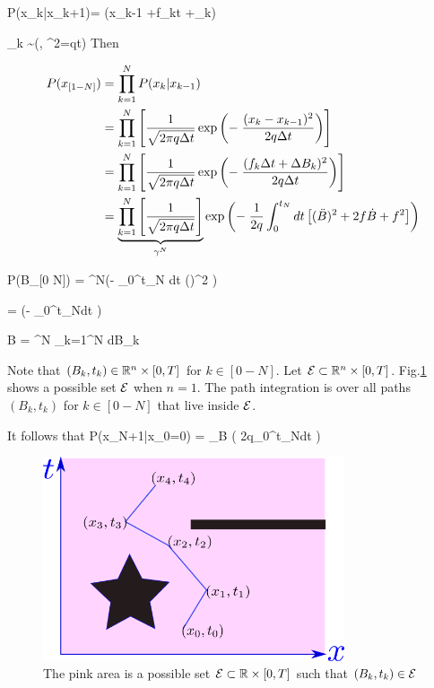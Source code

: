 \beq\color{blue}
P(x_k|x_{k+1})= \indi(x_{k-1}
+f_k\Delta t +\Delta\rvB_k)
\eeq

\beq \color{blue}
\Delta\rvB_k \sim \caln(, \s^2=q\Delta t)
\eeq
Then

\begin{align}
P(x_{[1- N]})&=
\prod_{k=1}^N P(x_k|x_{k-1})
\\
&=
\prod_{k=1}^N
\left[
\frac{1}{\sqrt{2\pi q\Delta t}}
\exp\left(
-\;
\frac{(x_k-x_{k-1})^2}{2q\Delta t}
\right)
\right]
\\
&=
\prod_{k=1}^N
\left[
\frac{1}{\sqrt{2\pi q \Delta t}}
\exp\left(
-\;
\frac{(f_k\Delta t + \Delta B_k)^2}{2q\Delta t}
\right)
\right]
\\
&=
\underbrace{\prod_{k=1}^N
\left[
\frac{1}{\sqrt{2\pi q \Delta t}}
\right]}_{\gamma^N}
\exp\left(
-\;
\frac{1}
{2q}\int_0^{t_N}dt
\left[(\ddot{B})^2 +
2f\dot{B} +f^2\right]
\right)
\end{align}



\beq
P(B_{[0 \upto N]})
=
\gamma^N\exp\left(-\;
\int_0^{t_N} dt ()^2
\right)
\eeq

\beq
{}=
\exp\left(-\;
\int_0^{t_N}dt
\right)
\label{eq-px-div-pb}
\eeq

\beq
\cald B = \gamma^N \prod_{k=1}^N dB_k
\eeq

Note that
$(B_k, t_k)\in { \mathbb{R}}^n\times [0, T]$
for $k\in[0-N]$.
Let
${\cal E}\subset { \mathbb{R}}^n\times [0, T]$. 
Fig.\ref{fig-possible-paths}
shows a possible set ${\cal E}$
when $n=1$.
The path integration is over all
paths $(B_k, t_k)$ for $k\in [0-N]$
that live inside ${\cal E}$.

It follows that
\beq
P(x_{N+1}|x_0=0)  =
\int_{\cale}\cald B\;
\exp\left(
{2q}\int_0^{t_N}dt
\right)
\eeq


\begin{figure}[h!]
\centering
\includegraphics[width=3.5in]
{stochastic-diff-eqns/possible-paths.png}
\caption{The pink area is a possible set 
${\cal E}\subset{ \mathbb{R}}\times [0,T]$
such that  $(B_k, t_k)\in {\cal E}$
}
\label{fig-possible-paths}
\end{figure}

